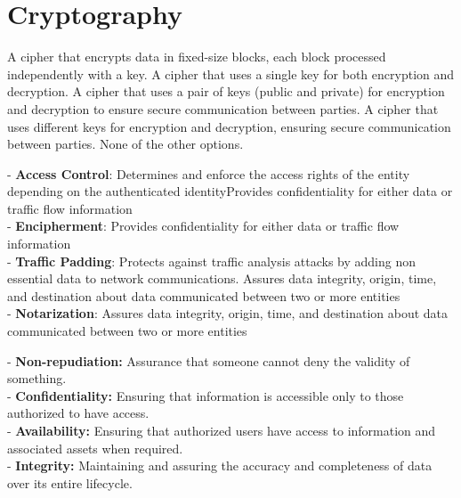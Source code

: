 \section{Cryptography}





\begin{checkboxes}
    \choice A cipher that encrypts data in fixed-size blocks, each block processed independently with a key.
    \choice A cipher that uses a single key for both encryption and decryption.
    \CorrectChoice A cipher that uses a pair of keys (public and private) for encryption and decryption to ensure secure communication between parties.
    \CorrectChoice A cipher that uses different keys for encryption and decryption, ensuring secure communication between parties.
    \choice None of the other options.
\end{checkboxes}


\begin{solution}
    - \textbf{Access Control}: Determines and enforce the access rights of the entity depending on the authenticated identityProvides confidentiality for either data or traffic flow information \\
    - \textbf{Encipherment}: Provides confidentiality for either data or traffic flow information \\
    - \textbf{Traffic Padding}: Protects against traffic analysis attacks by adding non essential data to network communications. Assures data integrity, origin, time, and destination about data communicated between two or more entities \\
    - \textbf{Notarization}: Assures data integrity, origin, time, and destination about data communicated between two or more entities \\
\end{solution}

\begin{solution}
    - \textbf{Non-repudiation:} Assurance that someone cannot deny the validity of something. \\
    - \textbf{Confidentiality:} Ensuring that information is accessible only to those authorized to have access. \\
    - \textbf{Availability:} Ensuring that authorized users have access to information and associated assets when required. \\
    - \textbf{Integrity:} Maintaining and assuring the accuracy and completeness of data over its entire lifecycle. \\
\end{solution}

